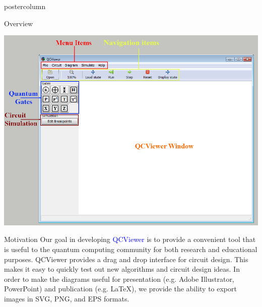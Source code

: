 \documentclass[final]{beamer} %
\begin{document}
\begin{frame}{}
\begin{columns}
\begin{column}{.33\textwidth}
\begin{beamercolorbox}[center,wd=\textwidth]{postercolumn}
\begin{minipage}[c][0.95\textheight][s]{0.95\columnwidth}
\begin{block}{\large Overview}
                \begin{center}
                    \includegraphics{figures/QCViewerGUI.png}
                \end{center}
            \end{block}
            \vfill
            \begin{block}{\large Motivation}
                Our goal in developing \textcolor{blue}{QCViewer} is to provide
                a convenient tool that is useful to the quantum computing
                community for both research and educational purposes.
                QCViewer provides a drag and drop interface for circuit design.
                This makes it easy to quickly test out new algorithms and circuit design ideas.
                In order to make the diagrams useful for presentation (e.g.
                Adobe Illustrator, PowerPoint) and publication (e.g. \LaTeX),
                we provide the ability to export images in SVG, PNG, and EPS formats.
                \begin{center}

\end{center}
\end{block}
\end{minipage}
\end{beamercolorbox}
\end{column}
\end{columns}
\end{frame}
\end{document}

